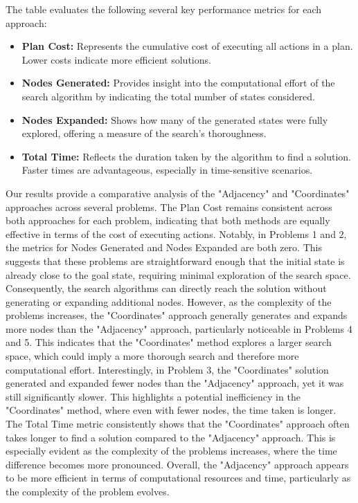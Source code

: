 \documentclass{article}
\begin{document}
The table evaluates the following several key performance metrics for each approach:

\begin{itemize}
    \item \textbf{Plan Cost:} Represents the cumulative cost of executing all actions in a plan. Lower costs indicate more efficient solutions.
    
    \item \textbf{Nodes Generated:} Provides insight into the computational effort of the search algorithm by indicating the total number of states considered.
    
    \item \textbf{Nodes Expanded:} Shows how many of the generated states were fully explored, offering a measure of the search's thoroughness.
    
    \item \textbf{Total Time:} Reflects the duration taken by the algorithm to find a solution. Faster times are advantageous, especially in time-sensitive scenarios.
\end{itemize}

Our results provide a comparative analysis of the "Adjacency" and "Coordinates" approaches across several problems. The Plan Cost remains consistent across both approaches for each problem, indicating that both methods are equally effective in terms of the cost of executing actions. Notably, in Problems 1 and 2, the metrics for Nodes Generated and Nodes Expanded are both zero. This suggests that these problems are straightforward enough that the initial state is already close to the goal state, requiring minimal exploration of the search space. Consequently, the search algorithms can directly reach the solution without generating or expanding additional nodes. However, as the complexity of the problems increases, the "Coordinates" approach generally generates and expands more nodes than the "Adjacency" approach, particularly noticeable in Problems 4 and 5. This indicates that the "Coordinates" method explores a larger search space, which could imply a more thorough search and therefore more computational effort. Interestingly, in Problem 3, the "Coordinates" solution generated and expanded fewer nodes than the "Adjacency" approach, yet it was still significantly slower. This highlights a potential inefficiency in the "Coordinates" method, where even with fewer nodes, the time taken is longer. The Total Time metric consistently shows that the "Coordinates" approach often takes longer to find a solution compared to the "Adjacency" approach. This is especially evident as the complexity of the problems increases, where the time difference becomes more pronounced. Overall, the "Adjacency" approach appears to be more efficient in terms of computational resources and time, particularly as the complexity of the problem evolves.
\end{document}
